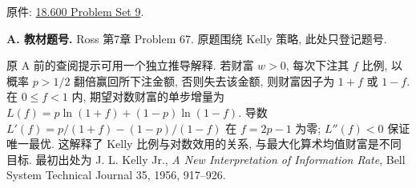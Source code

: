 原件: \href{https://ocw.mit.edu/courses/18-600-probability-and-random-variables-fall-2019/resources/mit18_600f19_pset9/}{18.600 Problem Set 9}.
\par\noindent\textbf{A. 教材题号.}\label{part:P9.A.1} Ross 第7章 Problem 67. 原题围绕 Kelly 策略, 此处只登记题号.
\begin{remark}
原 A 前的查阅提示可用一个独立推导解释. 若财富 $w>0$, 每次下注其 $f$ 比例, 以概率 $p>1/2$ 翻倍赢回所下注金额, 否则失去该金额, 则财富因子为 $1+f$ 或 $1-f$. 在 $0\le f<1$ 内, 期望对数财富的单步增量为 $L(f)=p\ln(1+f)+(1-p)\ln(1-f)$. 导数 $L'(f)=p/(1+f)-(1-p)/(1-f)$ 在 $f=2p-1$ 为零; $L''(f)<0$ 保证唯一最优. 这解释了 Kelly 比例与对数效用的关系, 与最大化算术均值财富是不同目标. 最初出处为 J. L. Kelly Jr., \textit{A New Interpretation of Information Rate}, Bell System Technical Journal 35, 1956, 917--926.
\end{remark}

